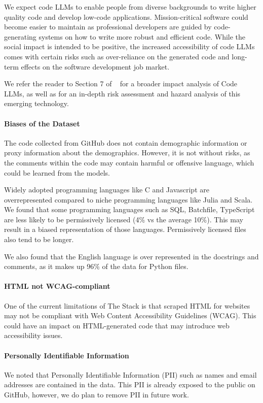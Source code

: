 We expect code LLMs to enable people from diverse backgrounds to write higher quality code and develop low-code applications. Mission-critical software could become easier to maintain as professional developers are guided by code-generating systems on how to write more robust and efficient code. While the social impact is intended to be positive, the increased accessibility of code LLMs comes with certain risks such as over-reliance on the generated code and long-term effects on the software development job market.

We refer the reader to Section 7 of ~\citet{chen2021codex} for a broader impact analysis of Code LLMs, as well as \citet{khlaaf2022hazard} for an in-depth risk assessment and hazard analysis of this emerging technology. 

\paragraph{Biases of the Dataset} The code collected from GitHub does not contain demographic information or proxy information about the demographics. However, it is not without risks, as the comments within the code may contain harmful or offensive language, which could be learned from the models.

Widely adopted programming languages like C and Javascript are  overrepresented compared to niche programming languages like Julia and Scala. We found that some programming languages such as SQL, Batchfile, TypeScript are less likely to be permissively licensed (4\% vs the average 10\%). This may result in a biased representation of those languages. Permissively licensed files also tend to be longer.

We also found that the English language is over represented in the docstrings and comments, as it makes up 96\% of the data for Python files.

\paragraph{HTML not WCAG-compliant} One of the current limitations of The Stack is that scraped HTML for websites may not be compliant with Web Content Accessibility Guidelines (WCAG). This could have an impact on HTML-generated code that may introduce web accessibility issues. 

\paragraph{Personally Identifiable Information} We noted that Personally Identifiable Information (PII) such as names and email addresses are contained in the data. This PII is already exposed to the public on GitHub, however, we do plan to remove PII in future work. 

